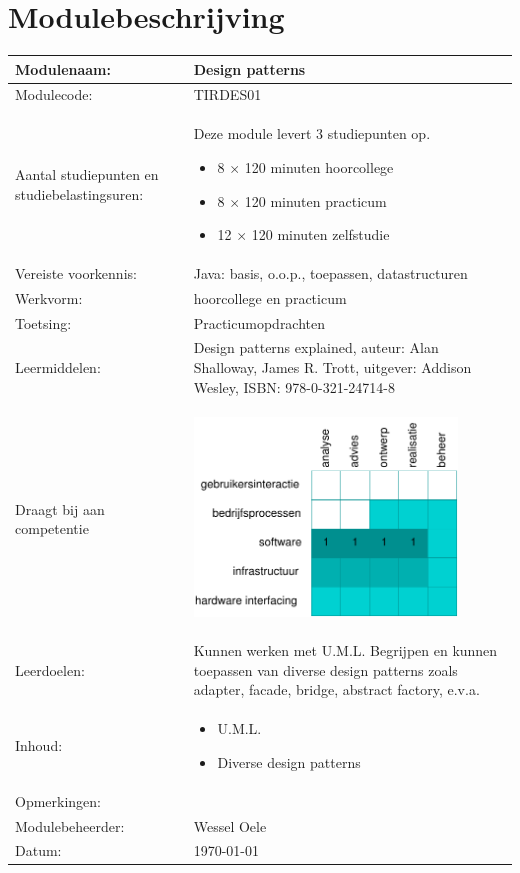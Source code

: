 \documentclass[titlepage,a4paper, 11pt]{article}
\newcommand{\mcode}{TIRDES01}  %
\newcommand{\mname}{Design patterns} %
\begin{document}
\section*{Modulebeschrijving}
\scriptsize
\begin{tabular}{|p{3cm}|p{11cm}|}
\hline
Modulenaam:&\mname\\
\hline
Modulecode:&\mcode\\
\hline
Aantal studiepunten en studiebelastingsuren:&Deze module levert 3 studiepunten op.
\begin{itemize}
\item 8 $\times$ 120 minuten hoorcollege
\item 8 $\times$ 120 minuten practicum
\item 12 $\times$ 120 minuten zelfstudie
\end{itemize}
\\
\hline
Vereiste voorkennis:&Java: basis, o.o.p., toepassen, datastructuren\\
\hline
Werkvorm:&hoorcollege en practicum\\
\hline
Toetsing:&Practicumopdrachten\\
\hline
Leermiddelen:&Design patterns explained, auteur: Alan Shalloway, James R. Trott, uitgever: Addison Wesley, ISBN: 978-0-321-24714-8\\
\hline
Draagt bij aan competentie&\begin{center}
\includegraphics[width=7cm]{comptabel}
\end{center}\\
\hline
Leerdoelen:&Kunnen werken met U.M.L. Begrijpen en kunnen toepassen van diverse design patterns zoals adapter, facade, bridge, abstract factory, e.v.a.\\
\hline
Inhoud:&
\begin{itemize}
\item U.M.L.
\item Diverse design patterns
\end{itemize}\\
\hline
Opmerkingen:&\\
\hline
Modulebeheerder:&Wessel Oele\\
\hline 
Datum:&\today\\
\hline
\end{tabular}
\newpage
\normalsize
\end{document}
